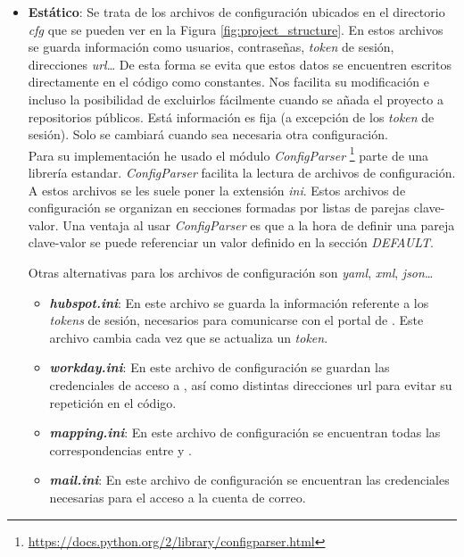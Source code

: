 \begin{itemize}[leftmargin=*]
\item \textbf{Estático}: Se trata de los archivos de configuración ubicados en el directorio \textit{cfg} que se pueden ver en la Figura \ref{fig:project_structure}.
En estos archivos se guarda información como usuarios, contraseñas, \textit{token} de sesión, direcciones \textit{url}\ldots
De esta forma se evita que estos datos se encuentren escritos directamente en el código como constantes. Nos facilita su modificación e
incluso la posibilidad de excluirlos fácilmente cuando se añada el proyecto a repositorios públicos.
Está información es fija (a excepción de los \textit{token} de sesión). Solo se cambiará cuando sea necesaria otra configuración.\\

Para su implementación he usado el módulo \textit{ConfigParser} \footnote{\url{https://docs.python.org/2/library/configparser.html}} parte de una librería estandar. \textit{ConfigParser} facilita la lectura de archivos de configuración. A estos archivos se les suele poner la extensión \textit{ini}. %
Estos archivos de configuración se organizan en secciones formadas por listas de parejas clave-valor.
Una ventaja al usar \textit{ConfigParser} es que a la hora de definir una pareja clave-valor se puede referenciar un valor definido en la sección \textit{DEFAULT}. 


Otras alternativas para los archivos de configuración son \textit{yaml}, \textit{xml}, \textit{json}\ldots


\begin{itemize}
	\item [\textendash] \textbf{\textit{hubspot.ini}}: En este archivo se guarda la información referente a los \textit{tokens} de sesión, necesarios para comunicarse con el portal de \hs. 
	Este archivo cambia cada vez que se actualiza un \textit{token}.
	\item [\textendash] \textbf{\textit{workday.ini}}: En este archivo de configuración se 
	guardan las credenciales de acceso a \wday{}, así como distintas direcciones url para evitar su repetición en el código.
	\item [\textendash] \textbf{\textit{mapping.ini}}: En este archivo de configuración se encuentran todas las correspondencias entre \hs{} y \wday.
	\item [\textendash] \textbf{\textit{mail.ini}}: En este archivo de configuración se encuentran las credenciales necesarias para el acceso a la cuenta de correo.
\end{itemize}





\end{itemize}
